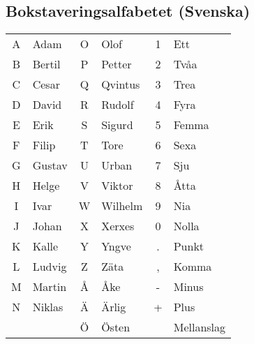 \documentclass[10pt,swedish,a4paper,twoside]{article}
\begin{document}
\subsection{Bokstaveringsalfabetet (Svenska)}

\begin{center}
\begin{tabular}{cl|cl|cl }
	A & Adam   & O & Olof    & 1 & Ett \\
	B & Bertil & P & Petter  & 2 & Tvåa \\
	C & Cesar  & Q & Qvintus & 3 & Trea \\
	D & David  & R & Rudolf  & 4 & Fyra \\
	E & Erik   & S & Sigurd  & 5 & Femma \\
	F & Filip  & T & Tore    & 6 & Sexa \\
	G & Gustav & U & Urban   & 7 & Sju \\
	H & Helge  & V & Viktor  & 8 & Åtta \\
	I & Ivar   & W & Wilhelm & 9 & Nia \\
	J & Johan  & X & Xerxes  & 0 & Nolla \\
	K & Kalle  & Y & Yngve   & . & Punkt\\
	L & Ludvig & Z & Zäta    & , & Komma\\
	M & Martin & Å & Åke     & - & Minus\\
	N & Niklas & Ä & Ärlig   & + & Plus\\
	  &        & Ö & Östen   &   & Mellanslag\\
\end{tabular}
\end{center}
\end{document}
